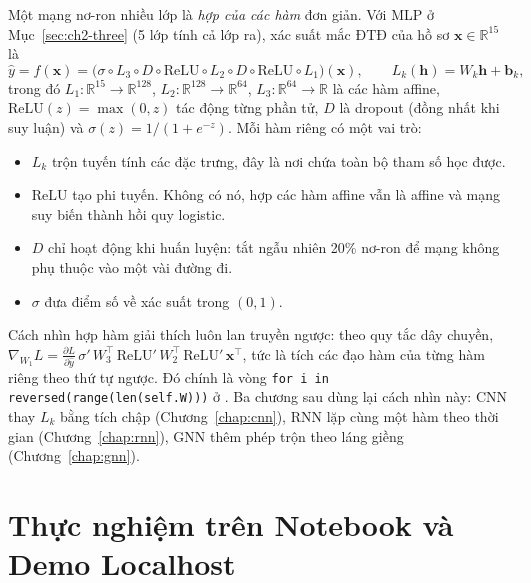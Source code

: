 Một mạng nơ-ron nhiều lớp là \emph{hợp của các hàm} đơn giản. Với MLP ở Mục~\ref{sec:ch2-three} (5 lớp tính cả lớp ra), xác suất mắc ĐTĐ của hồ sơ $\mathbf x\in\mathbb R^{15}$ là
\begin{equation}
\hat y = f(\mathbf x) = \big(\sigma \circ L_3 \circ D \circ \mathrm{ReLU} \circ L_2 \circ D \circ \mathrm{ReLU} \circ L_1\big)(\mathbf x),
\qquad L_k(\mathbf h) = W_k \mathbf h + \mathbf b_k ,
\label{eq:ch2-compose}
\end{equation}
trong đó $L_1:\mathbb R^{15}\!\to\!\mathbb R^{128}$, $L_2:\mathbb R^{128}\!\to\!\mathbb R^{64}$, $L_3:\mathbb R^{64}\!\to\!\mathbb R$ là các hàm affine, $\mathrm{ReLU}(z)=\max(0,z)$ tác động từng phần tử, $D$ là dropout (đồng nhất khi suy luận) và $\sigma(z)=1/(1+e^{-z})$. Mỗi hàm riêng có một vai trò:
\begin{itemize}
  \item $L_k$ trộn tuyến tính các đặc trưng, đây là nơi chứa toàn bộ tham số học được.
  \item $\mathrm{ReLU}$ tạo phi tuyến. Không có nó, hợp các hàm affine vẫn là affine và mạng suy biến thành hồi quy logistic.
  \item $D$ chỉ hoạt động khi huấn luyện: tắt ngẫu nhiên 20\% nơ-ron để mạng không phụ thuộc vào một vài đường đi.
  \item $\sigma$ đưa điểm số về xác suất trong $(0,1)$.
\end{itemize}
Cách nhìn hợp hàm giải thích luôn lan truyền ngược: theo quy tắc dây chuyền, $\nabla_{W_1} L = \frac{\partial L}{\partial \hat y}\,\sigma'\,W_3^\top\,\mathrm{ReLU}'\,W_2^\top\,\mathrm{ReLU}'\,\mathbf x^\top$, tức là tích các đạo hàm của từng hàm riêng theo thứ tự ngược. Đó chính là vòng \texttt{for i in reversed(range(len(self.W)))} ở . Ba chương sau dùng lại cách nhìn này: CNN thay $L_k$ bằng tích chập (Chương~\ref{chap:cnn}), RNN lặp cùng một hàm theo thời gian (Chương~\ref{chap:rnn}), GNN thêm phép trộn theo láng giềng (Chương~\ref{chap:gnn}).

\section{Thực nghiệm trên Notebook và Demo Localhost}
\label{sec:ch2-notebook-demo}


